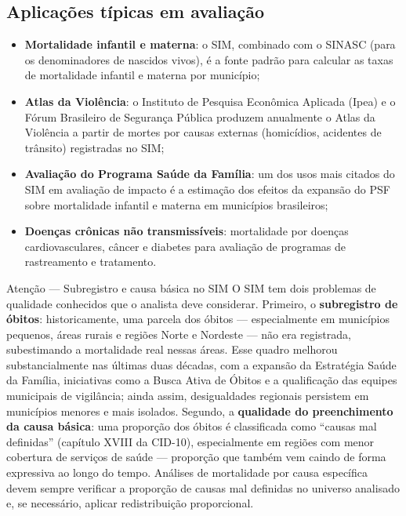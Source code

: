 \subsection{Aplicações típicas em avaliação}

\begin{itemize}
  \item \textbf{Mortalidade infantil e materna}: o SIM, combinado com o SINASC (para os denominadores de nascidos vivos), é a fonte padrão para calcular as taxas de mortalidade infantil e materna por município;
  \item \textbf{Atlas da Violência}: o Instituto de Pesquisa Econômica Aplicada (Ipea) e o Fórum Brasileiro de Segurança Pública produzem anualmente o Atlas da Violência a partir de mortes por causas externas (homicídios, acidentes de trânsito) registradas no SIM;
  \item \textbf{Avaliação do Programa Saúde da Família}: um dos usos mais citados do SIM em avaliação de impacto é a estimação dos efeitos da expansão do PSF sobre mortalidade infantil e materna em municípios brasileiros;
  \item \textbf{Doenças crônicas não transmissíveis}: mortalidade por doenças cardiovasculares, câncer e diabetes para avaliação de programas de rastreamento e tratamento.
\end{itemize}

\begin{boxatencao}{Atenção --- Subregistro e causa básica no SIM}
O SIM tem dois problemas de qualidade conhecidos que o analista deve considerar. Primeiro, o \textbf{subregistro de óbitos}: historicamente, uma parcela dos óbitos --- especialmente em municípios pequenos, áreas rurais e regiões Norte e Nordeste --- não era registrada, subestimando a mortalidade real nessas áreas. Esse quadro melhorou substancialmente nas últimas duas décadas, com a expansão da Estratégia Saúde da Família, iniciativas como a Busca Ativa de Óbitos e a qualificação das equipes municipais de vigilância; ainda assim, desigualdades regionais persistem em municípios menores e mais isolados. Segundo, a \textbf{qualidade do preenchimento da causa básica}: uma proporção dos óbitos é classificada como ``causas mal definidas'' (capítulo XVIII da CID-10), especialmente em regiões com menor cobertura de serviços de saúde --- proporção que também vem caindo de forma expressiva ao longo do tempo. Análises de mortalidade por causa específica devem sempre verificar a proporção de causas mal definidas no universo analisado e, se necessário, aplicar redistribuição proporcional.
\end{boxatencao}


